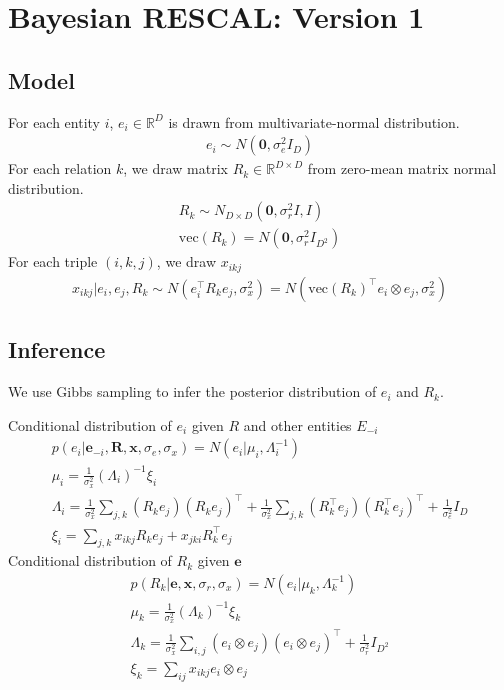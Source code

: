\documentclass{article}
\theoremstyle{definition}
\begin{document}
 
\section{Bayesian RESCAL: Version 1}
\subsection{Model}

For each entity $i$, $e_i \in \mathbb{R}^{D}$ is drawn from multivariate-normal distribution.
\begin{align}
e_i \sim {N}(\mathbf{0}, \sigma_e^2{I}_D)
\end{align}
For each relation $k$, we draw matrix $R_k \in \mathbb{R}^{D\times D}$ from zero-mean matrix normal distribution.
\begin{align}
R_k \sim {N}_{D \times D}(\mathbf{0}, \sigma_r^2{I}, {I}) \\
\text{vec}(R_k) = N(\mathbf{0}, \sigma_r^2 I_{D^2})
\end{align}
For each triple $(i,k,j)$, we draw $x_{ikj}$ 
\begin{align}
x_{ikj} |e_i, e_j, R_k \sim N(e_i^{\top} R_k e_j, \sigma_x^2) = N(\text{vec}(R_k)^{\top} e_i \otimes e_j, \sigma_x^2)
\end{align}

\subsection{Inference}
We use Gibbs sampling to infer the posterior distribution of $e_i$ and $R_k$.

Conditional distribution of $e_i$ given $R$ and other entities $E_{-i}$
\begin{align}
p(e_i |\mathbf{e}_{-i}, \mathbf{R}, \mathbf{x}, \sigma_e, \sigma_x) = N(e_i | \mu_i, \Lambda_i^{-1})\\
\mu_i = \frac{1}{\sigma_x^2}(\Lambda_i)^{-1}\xi_i \\
\Lambda_i = \frac{1}{\sigma_x^2} \sum_{j,k} (R_k e_j)(R_k e_j)^\top + \frac{1}{\sigma_x^2} \sum_{j,k} (R_k^\top e_j)(R_k^\top e_j)^\top+ \frac{1}{\sigma_e^2} {I}_D\\
\xi_i = \sum_{j,k} x_{ikj} R_{k} e_{j} + x_{jki} R_{k}^\top e_{j}
\end{align}
Conditional distribution of $R_k$ given $\mathbf{e}$
\begin{align}
p(R_k|\mathbf{e}, \mathbf{x}, \sigma_r, \sigma_x)  = N(e_i | \mu_k, \Lambda_k^{-1})\\
\mu_k = \frac{1}{\sigma_x^2}(\Lambda_k)^{-1}\xi_k \\
\Lambda_k = \frac{1}{\sigma_x^2} \sum_{i,j} (e_i \otimes e_j)(e_i \otimes e_j)^\top + \frac{1}{\sigma_r^2} {I}_{D^2}\\
\xi_k = \sum_{ij} x_{ikj} e_{i} \otimes e_{j}
\end{align}



\end{document}
